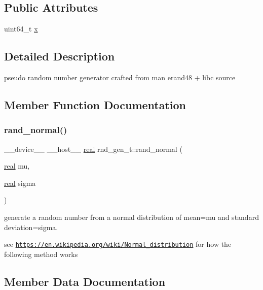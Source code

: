 \subsection*{Public Attributes}
\begin{DoxyCompactItemize}
\item 
uint64\+\_\+t \hyperlink{structrnd__gen__t_a80b2d559c8a8046b6e979840ad3379be}{x}
\end{DoxyCompactItemize}


\subsection{Detailed Description}
pseudo random number generator crafted from man erand48 + libc source 

\subsection{Member Function Documentation}
\mbox{\label{structrnd__gen__t_a6015e76eb30c192e3b64a9bc2b546535}} 
\subsubsection{\texorpdfstring{rand\+\_\+normal()}{rand\_normal()}}
{\footnotesize\ttfamily \+\_\+\+\_\+device\+\_\+\+\_\+ \+\_\+\+\_\+host\+\_\+\+\_\+ \hyperlink{vgg__util_8h_a1082d08aaa761215ec83e7149f27ad16}{real} rnd\+\_\+gen\+\_\+t\+::rand\+\_\+normal (\begin{DoxyParamCaption}\item[{\hyperlink{vgg__util_8h_a1082d08aaa761215ec83e7149f27ad16}{real}}]{mu,  }\item[{\hyperlink{vgg__util_8h_a1082d08aaa761215ec83e7149f27ad16}{real}}]{sigma }\end{DoxyParamCaption})\hspace{0.3cm}{\ttfamily [inline]}}



generate a random number from a normal distribution of mean=mu and standard deviation=sigma. 

see \href{https://en.wikipedia.org/wiki/Normal_distribution}{\tt https\+://en.\+wikipedia.\+org/wiki/\+Normal\+\_\+distribution} for how the following method works 

\subsection{Member Data Documentation}
\mbox{\label{structrnd__gen__t_a80b2d559c8a8046b6e979840ad3379be}} 
